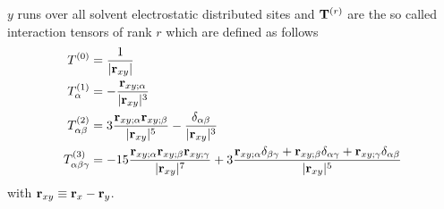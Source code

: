 \documentclass[b5paper,oneside,fleqn,11pt]{book}
\begin{document}
\begin{refsection}
$y$ runs over all solvent electrostatic distributed sites
and ${\bf T}^{(r)}$ are the so called interaction tensors of rank $r$ which are defined as follows
%
\begin{subequations}
\label{e:interaction-tensors}
\begin{align}
  T^{(0)} &= \frac{1}{\rvert {\bf r}_{xy} \lvert}  \label{e:interaction-tensors-1} \\
  T^{(1)}_\alpha &=-\frac{{\bf r}_{xy;\alpha}}{\rvert {\bf r}_{xy} \lvert^3}  \label{e:interaction-tensors-2} \\
  T^{(2)}_{\alpha\beta} &=3\frac{{\bf r}_{xy;\alpha} {\bf r}_{xy;\beta} }{\rvert {\bf r}_{xy} \lvert^5}  
      - \frac{\delta_{\alpha\beta}}{\rvert {\bf r}_{xy} \lvert^3}             \label{e:interaction-tensors-3} \\
  T^{(3)}_{\alpha\beta\gamma} &= -15 
         \frac{{\bf r}_{xy;\alpha} {\bf r}_{xy;\beta} {\bf r}_{xy;\gamma} }{\rvert {\bf r}_{xy} \lvert^7}
                  +3 \frac{{\bf r}_{xy;\alpha} \delta_{\beta\gamma}+
                           {\bf r}_{xy;\beta}  \delta_{\alpha\gamma}+
                           {\bf r}_{xy;\gamma} \delta_{\alpha\beta}}{\rvert {\bf r}_{xy} \lvert^5} \label{e:interaction-tensors-4}
\end{align}
\end{subequations}
%
with ${\bf r}_{xy} \equiv {\bf r}_x - {\bf r}_y$.


\end{refsection}
\end{document}
